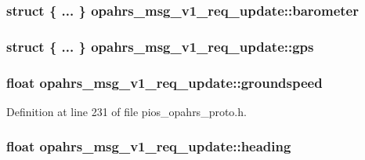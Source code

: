 \hypertarget{structopahrs__msg__v1__req__update_a947a1e1b5bbf1f1ad7b64382299a96fb}{
\subsubsection[{barometer}]{\setlength{\rightskip}{0pt plus 5cm}struct \{ ... \}   opahrs\-\_\-msg\-\_\-v1\-\_\-req\-\_\-update\-::barometer}}\label{structopahrs__msg__v1__req__update_a947a1e1b5bbf1f1ad7b64382299a96fb}
\hypertarget{structopahrs__msg__v1__req__update_a01d304b5741159f75a7a0b061c3b5bfa}{
\subsubsection[{gps}]{\setlength{\rightskip}{0pt plus 5cm}struct \{ ... \}   opahrs\-\_\-msg\-\_\-v1\-\_\-req\-\_\-update\-::gps}}\label{structopahrs__msg__v1__req__update_a01d304b5741159f75a7a0b061c3b5bfa}
\hypertarget{structopahrs__msg__v1__req__update_a25d172d1b353aa54d3421cec66d12691}{
\subsubsection[{groundspeed}]{\setlength{\rightskip}{0pt plus 5cm}float opahrs\-\_\-msg\-\_\-v1\-\_\-req\-\_\-update\-::groundspeed}}\label{structopahrs__msg__v1__req__update_a25d172d1b353aa54d3421cec66d12691}


Definition at line 231 of file pios\-\_\-opahrs\-\_\-proto.\-h.

\hypertarget{structopahrs__msg__v1__req__update_a485a3a06803f07b829a5dbc73907af17}{
\subsubsection[{heading}]{\setlength{\rightskip}{0pt plus 5cm}float opahrs\-\_\-msg\-\_\-v1\-\_\-req\-\_\-update\-::heading}}\label{structopahrs__msg__v1__req__update_a485a3a06803f07b829a5dbc73907af17}


